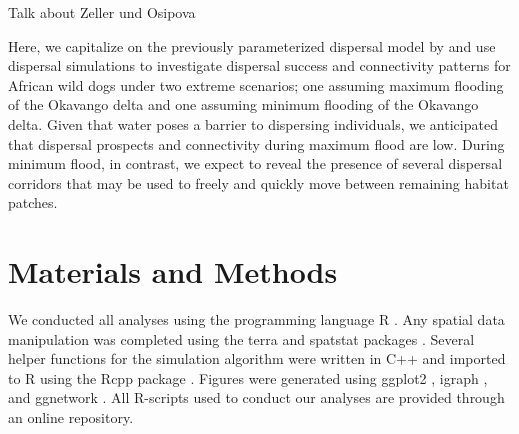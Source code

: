 \documentclass[abstract=on,10pt,a4paper,bibliography=totocnumbered]{article}
\begin{document}
Talk about Zeller und Osipova

Here, we capitalize on the previously parameterized dispersal model by
\cite{Hofmann.2022} and use dispersal simulations to investigate dispersal
success and connectivity patterns for African wild dogs under two extreme
scenarios; one assuming maximum flooding of the Okavango delta and one assuming
minimum flooding of the Okavango delta. Given that water poses a barrier to
dispersing individuals, we anticipated that dispersal prospects and connectivity
during maximum flood are low. During minimum flood, in contrast, we expect to
reveal the presence of several dispersal corridors that may be used to freely
and quickly move between remaining habitat patches.

\section{Materials and Methods}
We conducted all analyses using the programming language \textsf{R}
\citep{RCoreTeam.2022}. Any spatial data manipulation was completed using the
\textsf{terra} \citep{Hijmans.2022} and \textsf{spatstat} packages
\citep{Baddeley.2015}. Several helper functions for the simulation algorithm
were written in \textsf{C++} and imported to R using the \textsf{Rcpp} package
\citep{Eddelbuettel.2011}. Figures were generated using \textsf{ggplot2}
\citep{Wickham.2016}, \textsf{igraph} \citep{Csardi.2006}, and
\textsf{ggnetwork} \citep{Briatte.2021}. All R-scripts used to conduct our
analyses are provided through an online repository.
\end{document}
